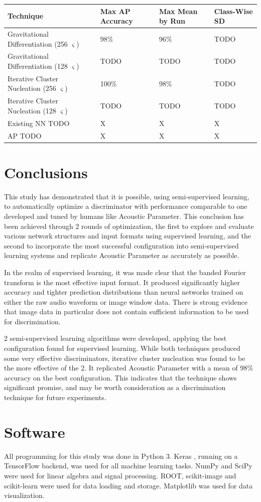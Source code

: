 \documentclass[10pt]{article}
\begin{document}
\begin{tabular}{|l|l|l|l|}
    \hline
    Technique & Max AP Accuracy & Max Mean by Run & Class-Wise SD \\
    \hline
    Gravitational Differentiation (256 $\varsigma$) & 98\% & 96\% & TODO \\
    \hline
    Gravitational Differentiation (128 $\varsigma$) & TODO & TODO & TODO \\
    \hline
    Iterative Cluster Nucleation (256 $\varsigma$) & 100\% & 98\% & TODO \\
    \hline
    Iterative Cluster Nucleation (128 $\varsigma$) & TODO & TODO & TODO \\
    \hline
    Existing NN TODO & X & X & X \\
    \hline
    AP TODO & X & X & X \\
    \hline
\end{tabular}

\section{Conclusions}

This study has demonstrated that it is possible, using semi-supervised learning, to automatically optimize a discriminator with performance comparable to one developed and tuned by humans like Acoustic Parameter. This conclusion has been achieved through 2 rounds of optimization, the first to explore and evaluate various network structures and input formats using supervised learning, and the second to incorporate the most successful configuration into semi-supervised learning systems and replicate Acoustic Parameter as accurately as possible.

In the realm of supervised learning, it was made clear that the banded Fourier transform is the most effective input format. It produced significantly higher accuracy and tighter prediction distributions than neural networks trained on either the raw audio waveform or image window data. There is strong evidence that image data in particular does not contain sufficient information to be used for discrimination.

2 semi-supervised learning algorithms were developed, applying the best configuration found for supervised learning. While both techniques produced some very effective discriminators, iterative cluster nucleation was found to be the more effective of the 2. It replicated Acoustic Parameter with a mean of 98\% accuracy on the best configuration. This indicates that the technique shows significant promise, and may be worth consideration as a discrimination technique for future experiments.

\section{Software}

All programming for this study was done in Python 3. Keras \cite{keras}, running on a TensorFlow backend, was used for all machine learning tasks. NumPy and SciPy were used for linear algebra and signal processing. ROOT, scikit-image and scikit-learn were used for data loading and storage. Matplotlib was used for data visualization.

\printbibliography
\end{document}
